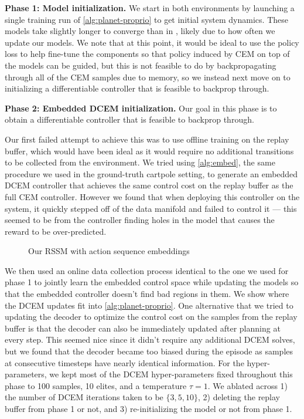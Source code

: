 \documentclass{article}
\begin{document}
\textbf{Phase 1: Model initialization.}
We start in both environments by launching a single training
run of \cref{alg:planet-proprio} to get initial system dynamics.
These models take slightly longer to converge
than in \citep{hafner2018learning}, likely due to how
often we update our models.
We note that at this point, it would be ideal to use the
policy loss to help fine-tune the components so that
policy induced by CEM on top of the models can be guided,
but this is not feasible to do by backpropagating through
all of the CEM samples due to memory, so we instead
next move on to initializing a differentiable controller
that is feasible to backprop through.

\textbf{Phase 2: Embedded DCEM initialization.}
Our goal in this phase is to obtain a differentiable controller
that is feasible to backprop through.

Our first failed attempt to achieve this was to use offline
training on the replay buffer, which would have been ideal
as it would require no additional transitions to be collected
from the environment.
We tried using \cref{alg:embed}, the same procedure we used
in the ground-truth cartpole setting, to generate an embedded
DCEM controller that achieves the same control cost on the replay
buffer as the full CEM controller.
However we found that when deploying this controller on the
system, it quickly stepped off of the data manifold and
failed to control it --- this seemed to be from the controller
finding holes in the model that causes the reward to
be over-predicted.

\begin{figure}[t]
\centering
\scalebox{0.95}{}
\caption{Our RSSM with action sequence embeddings}
\label{fig:rssm}
\end{figure}

We then used an online data collection process identical to
the one we used for phase 1 to jointly learn the embedded
control space while updating the models so that the embedded
controller doesn't find bad regions in them.
We show where the DCEM updates fit into \cref{alg:planet-proprio}.
One alternative that we tried to updating the decoder to
optimize the control cost on the samples from the
replay buffer is that the decoder can also be immediately
updated after planning at every step.
This seemed nice since it didn't require any additional
DCEM solves, but we found that the decoder became too
biased during the episode as samples at consecutive
timesteps have nearly identical information.
For the hyper-parameters, we kept most of the DCEM hyper-parameters
fixed throughout this phase to 100 samples, 10 elites,
and a temperature $\tau=1$.
We ablated across 1) the number of DCEM iterations taken
to be $\{3, 5, 10\}$, 2) deleting the replay buffer
from phase 1 or not, and 3) re-initializing the
model or not from phase 1.
\end{document}
